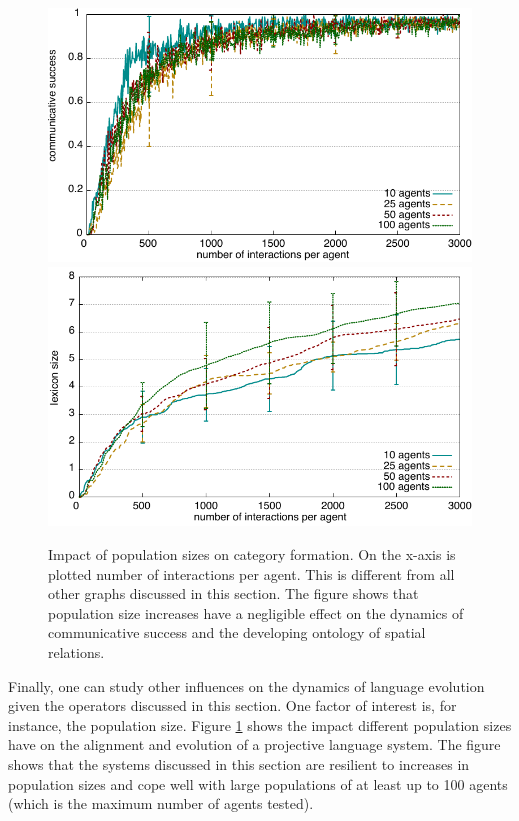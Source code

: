 \begin{figure}
\begin{center}
\includegraphics[width=0.9\columnwidth]{figs/category-formation-experiment-success-vs-population-size}
\includegraphics[width=0.9\columnwidth]{figs/category-formation-experiment-lexicon-size-vs-population-size}
\end{center}
\caption[Impact of population sizes on category formation]{
Impact of population sizes on category formation. On the x-axis is plotted number
of interactions per agent. This is different from all other graphs discussed in this section.
The figure shows that population size increases have a negligible effect on the dynamics
of communicative success and the developing ontology of spatial relations.}
\label{f:impact-population-size}
\end{figure}

Finally, one can study other influences on the dynamics of language evolution
given the operators discussed in this section. One factor of interest is, for instance,
the population size. Figure \ref{f:impact-population-size} shows the impact different
population sizes have on the alignment and evolution of a projective language
system. The figure shows that the systems discussed in this section are
resilient to increases in population sizes and cope well with large populations of at
least up to 100 agents (which is the maximum number of agents tested).




